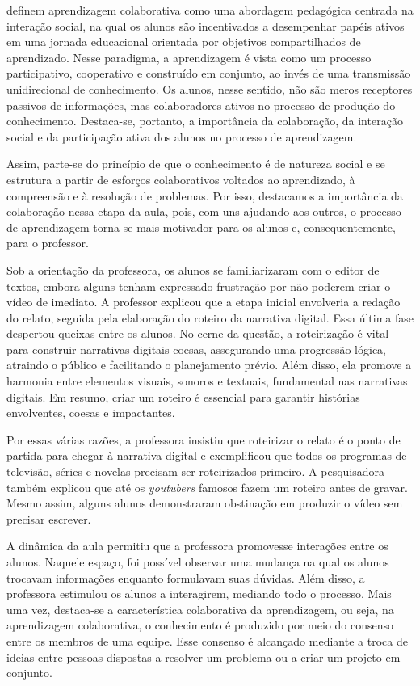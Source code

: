\documentclass[portuguese]{textolivre}
\begin{document}
\textcite{schmitz2018social} definem aprendizagem colaborativa como uma abordagem pedagógica centrada na interação social, na qual os alunos são incentivados a desempenhar papéis ativos em uma jornada educacional orientada por objetivos compartilhados de aprendizado. Nesse paradigma, a aprendizagem é vista como um processo participativo, cooperativo e construído em conjunto, ao invés de uma transmissão unidirecional de conhecimento. Os alunos, nesse sentido, não são meros receptores passivos de informações, mas colaboradores ativos no processo de produção do conhecimento. Destaca-se, portanto, a importância da colaboração, da interação social e da participação ativa dos alunos no processo de aprendizagem.

Assim, parte-se do princípio de que o conhecimento é de natureza social e se estrutura a partir de esforços colaborativos voltados ao aprendizado, à compreensão e à resolução de problemas. Por isso, destacamos a importância da colaboração nessa etapa da aula, pois, com uns ajudando aos outros, o processo de aprendizagem torna-se mais motivador para os alunos e, consequentemente, para o professor.

Sob a orientação da professora, os alunos se familiarizaram com o editor de textos, embora alguns tenham expressado frustração por não poderem criar o vídeo de imediato. A professor explicou que a etapa inicial envolveria a redação do relato, seguida pela elaboração do roteiro da narrativa digital. Essa última fase despertou queixas entre os alunos. No cerne da questão, a roteirização é vital para construir narrativas digitais coesas, assegurando uma progressão lógica, atraindo o público e facilitando o planejamento prévio. Além disso, ela promove a harmonia entre elementos visuais, sonoros e textuais, fundamental nas narrativas digitais. Em resumo, criar um roteiro é essencial para garantir histórias envolventes, coesas e impactantes.

Por essas várias razões, a professora insistiu que roteirizar o relato é o ponto de partida para chegar à narrativa digital e exemplificou que todos os programas de televisão, séries e novelas precisam ser roteirizados primeiro. A pesquisadora também explicou que até os \emph{youtubers} famosos fazem um roteiro antes de gravar. Mesmo assim, alguns alunos demonstraram obstinação em produzir o vídeo sem precisar escrever.

A dinâmica da aula permitiu que a professora promovesse interações entre os alunos. Naquele espaço, foi possível observar uma mudança na qual os alunos trocavam informações enquanto formulavam suas dúvidas. Além disso, a professora estimulou os alunos a interagirem, mediando todo o processo. Mais uma vez, destaca-se a característica colaborativa da aprendizagem, ou seja, na aprendizagem colaborativa, o conhecimento é produzido por meio do consenso entre os membros de uma equipe. Esse consenso é alcançado mediante a troca de ideias entre pessoas dispostas a resolver um problema ou a criar um projeto em conjunto.
\end{document}
